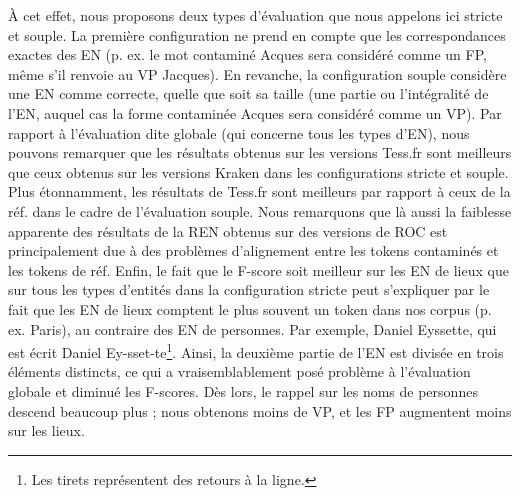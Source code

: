 À cet effet, nous proposons deux types d'évaluation que nous appelons ici \og{}stricte\fg{} et \og{}souple\fg{}. La première configuration ne prend en compte que les correspondances exactes des EN (p. ex. le mot contaminé \og{}Acques\fg{} sera considéré comme un FP, même s'il renvoie au VP \og{}Jacques\fg{}). En revanche, la configuration \og{}souple\fg{} considère une EN comme correcte, quelle que soit sa taille (une partie ou l'intégralité de l'EN, auquel cas la forme contaminée \og{}Acques\fg{} sera considéré comme un VP). Par rapport à l'évaluation dite \og{}globale\fg{} (qui concerne tous les types d'EN), nous pouvons remarquer que les résultats obtenus sur les versions Tess.fr sont meilleurs que ceux obtenus sur les versions Kraken dans les configurations stricte et souple.
  Plus étonnamment, les résultats de Tess.fr sont meilleurs par rapport à ceux de la réf. dans le cadre de l'évaluation souple.
 Nous remarquons que là aussi la faiblesse apparente des résultats de la REN obtenus sur des versions de ROC est principalement due à des problèmes d'alignement entre les tokens contaminés et les tokens de réf. 
  Enfin, le fait que le F-score soit meilleur sur les EN de lieux que sur tous les types d'entités dans la configuration stricte peut s'expliquer par le fait que les EN de lieux comptent le plus souvent un token dans nos corpus (p. ex. \og{}Paris\fg{}), au contraire des EN de personnes. Par exemple, \og{}Daniel Eyssette\fg{}, qui est écrit \og{}Daniel Ey-sset-te\fg{}\footnote{Les tirets représentent des retours à la ligne.}. Ainsi, la deuxième partie de l'EN est divisée en trois éléments distincts, ce qui a vraisemblablement posé problème à l'évaluation globale et diminué les F-scores. Dès lors, le rappel sur les noms de personnes descend beaucoup plus ; nous obtenons moins de VP, et les FP augmentent moins sur les lieux.


